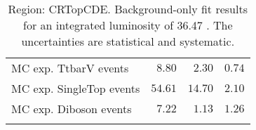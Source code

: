 \begin{table}
\begin{center}
{\begin{tabular*}{\textwidth}{@{\extracolsep{\fill}}lrrr}
        MC exp. TtbarV events         & $8.80$          & $2.30$          & $0.74$              \\
        MC exp. SingleTop events         & $54.61$          & $14.70$          & $2.10$              \\
        MC exp. Diboson events         & $7.22$          & $1.13$          & $1.26$              \\
\noalign{\smallskip}\hline\noalign{\smallskip}
\end{tabular*}
}
\end{center}
\caption{Region: CRTopCDE. Background-only fit results for an integrated luminosity of 36.47 \ifb. The uncertainties are statistical and systematic.
}
\label{table.bkgonly.CRTopCDE}
\end{table}
%